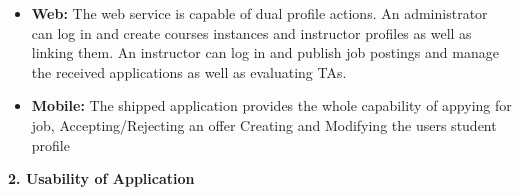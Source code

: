 \documentclass[12pt]{article}
\begin{document}
\begin{itemize}
	\item \textbf{Web:} The web service is capable of dual profile actions. An administrator can log in and create courses instances and instructor profiles as well as linking them. An instructor can log in and publish job postings and manage the received applications as well as evaluating TAs.
    
	\item \textbf{Mobile:} The shipped application provides the whole capability of appying for job, Accepting/Rejecting an offer
 Creating and Modifying the users student profile 

\end{itemize}

\textbf{2. Usability of Application}
\end{document}
